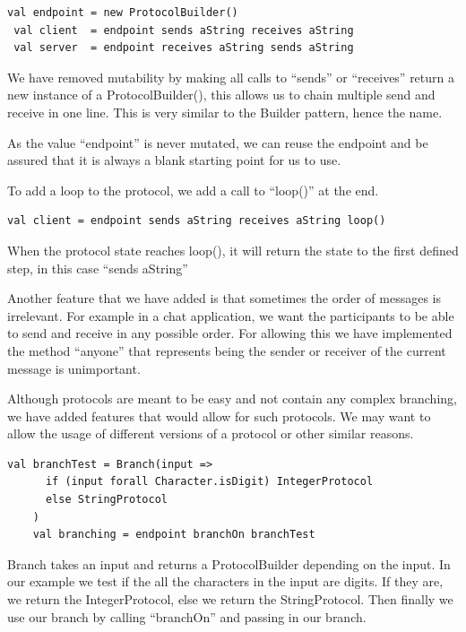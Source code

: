 \begin{lstlisting}[style=myScalastyle]
 val endpoint = new ProtocolBuilder()
 val client  = endpoint sends aString receives aString
 val server  = endpoint receives aString sends aString
\end{lstlisting}
We have removed mutability by making all calls to ``sends'' or ``receives'' return a new instance of a ProtocolBuilder(), this allows us to chain multiple send and receive in one line. This is very similar to the Builder pattern, hence the name.

As the value ``endpoint'' is never mutated, we can reuse the endpoint and be assured that it is always a blank starting point for us to use. 

To add a loop to the protocol, we add a call to ``loop()'' at the end.
\begin{lstlisting}[style=myScalastyle]
 val client = endpoint sends aString receives aString loop()
\end{lstlisting}
When the protocol state reaches loop(), it will return the state to the first defined step, in this case ``sends aString'' 

Another feature that we have added is that sometimes the order of messages is irrelevant. For example in a chat application, we want the participants to be able to send and receive in any possible order. For allowing this we have implemented the method ``anyone'' that represents being the sender or receiver of the current message is unimportant.

Although protocols are meant to be easy and not contain any complex branching, we have added features that would allow for such protocols. We may want to allow the usage of different versions of a protocol or other similar reasons.
\begin{lstlisting}[style=myScalastyle]
    val branchTest = Branch(input =>
      if (input forall Character.isDigit) IntegerProtocol
      else StringProtocol
    )
    val branching = endpoint branchOn branchTest
\end{lstlisting}
Branch takes an input and returns a ProtocolBuilder depending on the input. In our example we test if the all the characters in the input are digits. If they are, we return the IntegerProtocol, else we return the StringProtocol. Then finally we use our branch by calling ``branchOn'' and passing in our branch. 

